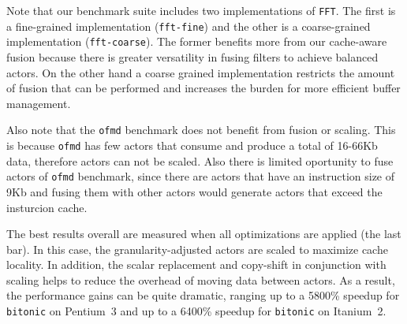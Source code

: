 Note that our benchmark suite
includes two implementations of \texttt{FFT}. The first is a
fine-grained implementation (\texttt{fft-fine}) and the other is a
coarse-grained implementation (\texttt{fft-coarse}). The former
benefits more from our cache-aware fusion because there is greater
versatility in fusing filters to achieve balanced actors. On the other hand
a coarse grained implementation restricts the amount of fusion that
can be performed and increases the burden for more efficient buffer
management. 

Also note that the \texttt{ofmd} benchmark does not benefit from fusion or
scaling. This is because  \texttt{ofmd} has few actors that consume 
and produce a total of 16-66Kb data, therefore actors can not be scaled.
Also there is limited oportunity to fuse actors of \texttt{ofmd} 
benchmark, since there are actors that have an instruction size of 9Kb 
and fusing them with other actors would generate actors that exceed the
insturcion cache.


The best results overall are measured when all optimizations are
applied (the last bar). In this case, the granularity-adjusted actors
are scaled to maximize cache locality. In addition, the scalar replacement
and copy-shift in conjunction with scaling helps to reduce the overhead of 
moving data between actors. As a result, the performance gains can be quite
dramatic, ranging up to a 5800\% speedup for \texttt{bitonic} on Pentium~3
and up to a 6400\% speedup for \texttt{bitonic} on Itanium~2.



